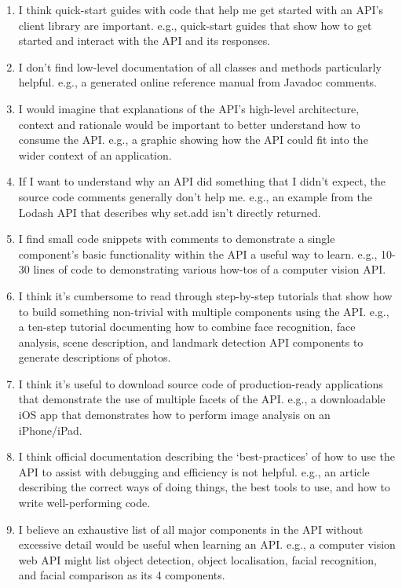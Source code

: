 \begin{enumerate}[label=Q3\alph*.,leftmargin=2\parindent]
\item I think quick-start guides with code that help me get started with an API’s client library are important.
 e.g., quick-start guides that show how to get started and interact with the API and its responses.
\item I don't find low-level documentation of all classes and methods particularly helpful.
 e.g., a generated online reference manual from Javadoc comments.  
\item I would imagine that explanations of the API's high-level architecture, context and rationale would be important to better understand how to consume the API.
  e.g., a graphic showing how the API could fit into the wider context of an application.  
\item If I want to understand why an API did something that I didn't expect, the source code comments generally don't help me.
  e.g., an example from the Lodash API that describes why set.add isn't directly returned.  
\item I find small code snippets with comments to demonstrate a single component's basic functionality within the API a useful way to learn.
  e.g., 10-30 lines of code to demonstrating various how-tos of a computer vision API.  
\item  I think it's cumbersome to read through step-by-step tutorials that show how to build something non-trivial with multiple components using the API. 
   e.g., a ten-step tutorial documenting how to combine face recognition, face analysis, scene description, and landmark detection API components to generate descriptions of photos.   
\item  I think it's useful to download source code of production-ready applications that demonstrate the use of multiple facets of the API. 
   e.g., a downloadable iOS app that demonstrates how to perform image analysis on an iPhone/iPad.
\item  I think official documentation describing the ‘best-practices’ of how to use the API to assist with debugging and efficiency is not helpful. 
   e.g., an article describing the correct ways of doing things, the best tools to use, and how to write well-performing code.   
\item  I believe an exhaustive list of all major components in the API without excessive detail would be useful when learning an API. 
   e.g., a computer vision web API might list object detection, object localisation, facial recognition, and facial comparison as its 4 components.   

\end{enumerate}
